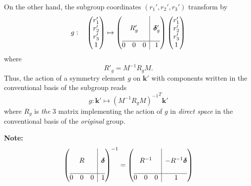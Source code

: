 \documentclass[12pt, a4paper]{article}
\begin{document}
On the other hand, the subgroup coordinates $(r_1',r_2',r_3')$ transform by
\begin{equation}
  g:\quad
  \begin{pmatrix}
    r_1'\\
    r_2'\\
    r_3'\\
    1
  \end{pmatrix}
  \mapsto
  \left(
  \begin{array}{@{}c|c@{}}
    \begin{matrix}
      \phantom{0} \\
      R_g' \\
      \phantom{0} 
    \end{matrix}&\bm{\delta}'_g\\
    \hline
    \begin{matrix}
      0&0&0
    \end{matrix}&1
  \end{array}
  \right)
  \begin{pmatrix}
    r_1'\\
    r_2'\\
    r_3'\\
    1
  \end{pmatrix}
\end{equation}
where
\begin{equation}
  R'_g=M^{-1}R_g M.
\end{equation} 
Thus, the action of a symmetry element $g$ on $\bm{k}'$ with components written in the conventional basis of the subgroup reads
\begin{equation}
  g:\bm{k}'\mapsto{{(M^{-1}R_{g}M)}^{-1}}^{T}\bm{k}'
\end{equation} 
where $R_{g}$ is \emph{the} 3 matrix implementing the action of $g$ in \emph{direct space} in the conventional basis of the \emph{original} group.

{\bf{\color{red}N\color{orange}o\color{green}t\color{blue}e\color{violet}:}}
\begin{equation}
  {\left(
  \begin{array}{@{}c|c@{}}
    \begin{matrix}
      \phantom{0} \\
      R \\
      \phantom{0} 
    \end{matrix}&\bm{\delta}\\
    \hline
    \begin{matrix}
      0&0&0
    \end{matrix}&1
  \end{array}
  \right)}^{-1}
  =
  \left(
  \begin{array}{@{}c|c@{}}
    \begin{matrix}
      \phantom{0} \\
      R^{-1} \\
      \phantom{0} 
    \end{matrix}&-R^{-1}\bm{\delta}\\
    \hline
    \begin{matrix}
      0&0&0
    \end{matrix}&1
  \end{array}
  \right)
\end{equation}
\end{document}
